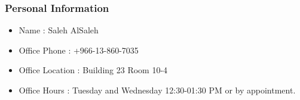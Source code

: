 \documentclass[
	11pt, %
]{beamer}
\begin{document}


\begin{frame}
	\frametitle{Personal Information}
	
	\begin{itemize}
		\item Name            : Saleh AlSaleh
		\item Office Phone    : +966-13-860-7035
		\item Office Location : Building 23 Room 10-4
		\item Office Hours    : Tuesday and Wednesday 12:30-01:30 PM or by appointment. 
	\end{itemize}

\end{frame}

\end{document}
